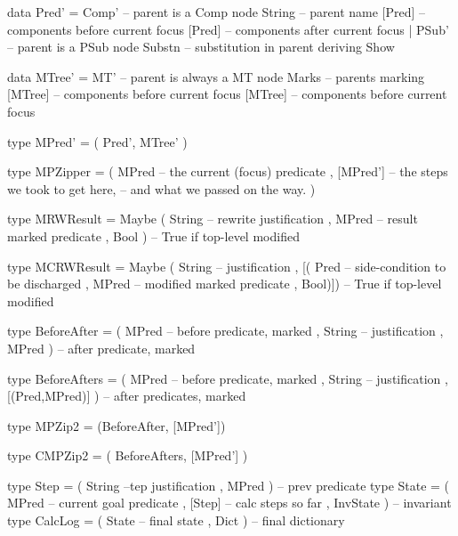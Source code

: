 \begin{code}
data Pred'
 = Comp'        -- parent is a Comp node
     String       -- parent name
     [Pred]     -- components before current focus
     [Pred]     -- components after current focus
 | PSub'        -- parent is a PSub node
     Substn   -- substitution in parent
 deriving Show

data MTree'
 = MT'       -- parent is always a MT node
     Marks     -- parents marking
     [MTree]   -- components before current focus
     [MTree]   -- components before current focus

type MPred' = ( Pred', MTree' )

type MPZipper
  = ( MPred    -- the current (focus) predicate
    , [MPred'] -- the steps we took to get here,
                   -- and what we passed on the way.
    )
\end{code}

\newpage
\begin{code}
type MRWResult
 = Maybe ( String  -- rewrite justification
         , MPred  -- result marked predicate
         , Bool )  -- True if top-level modified

type MCRWResult
 = Maybe ( String      -- justification
         , [( Pred   -- side-condition to be discharged
            , MPred   -- modified marked predicate
            , Bool)])  -- True if top-level modified
\end{code}


\begin{code}
type BeforeAfter
 = ( MPred   -- before predicate, marked
   , String      -- justification
   , MPred ) -- after predicate, marked
\end{code}

\begin{code}
type BeforeAfters
 = ( MPred   -- before predicate, marked
   , String      -- justification
   , [(Pred,MPred)] ) -- after predicates, marked
\end{code}

\begin{code}
type MPZip2 = (BeforeAfter, [MPred'])
\end{code}

\begin{code}
type CMPZip2 = ( BeforeAfters, [MPred'] )
\end{code}

\begin{code}
type Step
 = ( String        --tep justification
   , MPred )     -- prev predicate
type State
 = ( MPred       -- current goal predicate
   , [Step]      -- calc steps so far
   , InvState )  -- invariant
type CalcLog = ( State   -- final state
                 , Dict )  -- final dictionary
\end{code}
